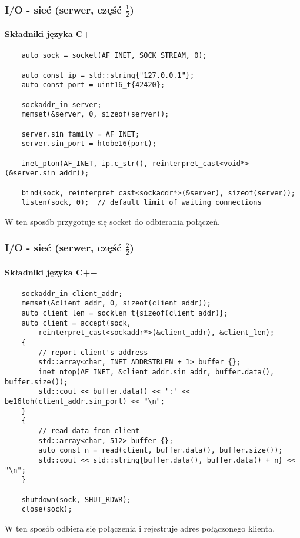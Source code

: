 \documentclass[aspectratio=169]{beamer}
\begin{document}
\begin{frame}[fragile]
    \frametitle{I/O - sieć (serwer, część $\frac{1}{2}$)}
    \framesubtitle{Składniki języka C++}

    {\tiny
    \begin{lstlisting}
    auto sock = socket(AF_INET, SOCK_STREAM, 0);

    auto const ip = std::string{"127.0.0.1"};
    auto const port = uint16_t{42420};

    sockaddr_in server;
    memset(&server, 0, sizeof(server));

    server.sin_family = AF_INET;
    server.sin_port = htobe16(port);

    inet_pton(AF_INET, ip.c_str(), reinterpret_cast<void*>(&server.sin_addr));

    bind(sock, reinterpret_cast<sockaddr*>(&server), sizeof(server));
    listen(sock, 0);  // default limit of waiting connections
    \end{lstlisting}}

    W ten sposób przygotuje się socket do odbierania połączeń.
\end{frame}

\begin{frame}[fragile]
    \frametitle{I/O - sieć (serwer, część $\frac{2}{2}$)}
    \framesubtitle{Składniki języka C++}

    {\tiny
    \begin{lstlisting}
    sockaddr_in client_addr;
    memset(&client_addr, 0, sizeof(client_addr));
    auto client_len = socklen_t{sizeof(client_addr)};
    auto client = accept(sock,
        reinterpret_cast<sockaddr*>(&client_addr), &client_len);
    {
        // report client's address
        std::array<char, INET_ADDRSTRLEN + 1> buffer {};
        inet_ntop(AF_INET, &client_addr.sin_addr, buffer.data(), buffer.size());
        std::cout << buffer.data() << ':' << be16toh(client_addr.sin_port) << "\n";
    }
    {
        // read data from client
        std::array<char, 512> buffer {};
        auto const n = read(client, buffer.data(), buffer.size());
        std::cout << std::string{buffer.data(), buffer.data() + n} << "\n";
    }

    shutdown(sock, SHUT_RDWR);
    close(sock);
    \end{lstlisting}}

    W ten sposób odbiera się połączenia i rejestruje adres połączonego klienta.
\end{frame}
\end{document}
